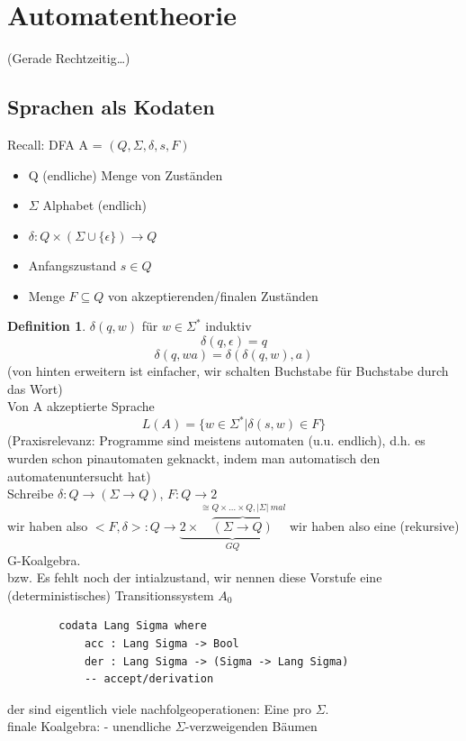 \documentclass{article}
\theoremstyle{definition}
\newtheorem{definition}{Definition}[section]
\begin{document}
	\section{Automatentheorie}
	(Gerade Rechtzeitig\dots)\\
	\subsection{Sprachen als Kodaten}
	Recall: DFA A = $(Q,\Sigma,\delta, s, F)$\\
	\begin{itemize}
		\item Q (endliche) Menge von Zuständen
		\item $\Sigma$ Alphabet (endlich)
		\item $\delta : Q\times (\Sigma\cup\{\epsilon\})\to Q$
		\item Anfangszustand $s\in Q$
		\item Menge $F\subseteq Q$ von akzeptierenden/finalen Zuständen
	\end{itemize}
	\begin{definition} $\delta(q,w)$ für $w\in\Sigma^*$ induktiv
	\[\delta(q,\epsilon)=q\]
	\[\delta(q,wa)=\delta(\delta(q,w),a)\]
	(von hinten erweitern ist einfacher, wir schalten Buchstabe für Buchstabe durch das Wort)\\
	Von A akzeptierte Sprache\\
	\[L(A) =\{ w\in\Sigma^*|\delta(s,w)\in F\}\]
	(Praxisrelevanz: Programme sind meistens automaten (u.u. endlich), d.h. es wurden schon pinautomaten geknackt, indem man automatisch den automatenuntersucht hat)\\
	Schreibe $\delta : Q \to (\Sigma\to Q)$, $F:Q\to 2$\\
	wir haben also $<F,\delta>:Q\to \underbrace{2\times \overbrace{(\Sigma\to Q)}^{\cong Q\times \dots\times Q,|\Sigma|\ mal}}_{GQ}$ wir haben also eine (rekursive) G-Koalgebra.\\
	bzw. Es fehlt noch der intialzustand, wir nennen diese Vorstufe eine (deterministisches) Transitionssystem $A_0$
	\begin{verbatim}
		codata Lang Sigma where
			acc : Lang Sigma -> Bool
			der : Lang Sigma -> (Sigma -> Lang Sigma)
			-- accept/derivation
	\end{verbatim}
	\end{definition}
	der sind eigentlich viele nachfolgeoperationen: Eine pro $\Sigma$.\\
	finale Koalgebra:
	- unendliche $\Sigma$-verzweigenden Bäumen\\
\end{document}
